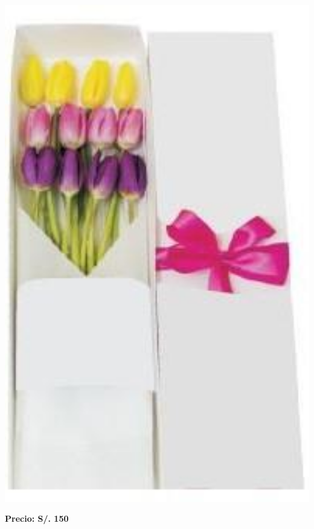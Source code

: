 \documentclass{article}
\begin{document}
\begin{minipage}{0.35\textwidth}
    \includegraphics[width=1.0\textwidth]{imagenes_extraidas/image_2_3}
\end{minipage}
\vspace{0.3cm}
\begin{center}
   \textbf{\Large Precio: \textcolor{cpred}{S/. 150 }}
\end{center}
\vspace{1cm}
\noindent
\end{document}
